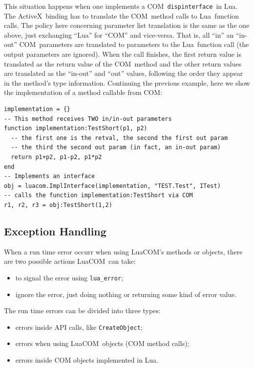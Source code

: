 \documentclass[11pt,a4paper,english]{report}
\newcommand{\ident}[1]{\mbox{\texttt{#1}}}
\newcommand{\techname}[1]{\mbox{#1}}
\newcommand{\lua}{\techname{Lua}}
\newcommand{\com}{\techname{COM}}
\newcommand{\activex}{\techname{ActiveX}}
\newcommand{\luacom}{\techname{LuaCOM}}
\newcommand{\dispinterface}{\ident{dispinterface}}
\begin{document}
  This situation happens when one implements a \com\ \dispinterface\
  in \lua. The \activex\ binding has to translate the \com\ method
  calls to \lua\ function calls. The policy here concerning parameter
  list translation is the same as the one above, just exchanging
  ``Lua'' for ``COM'' and vice-versa. That is, all ``in'' an
  ``in-out'' \com\ parameters are translated to parameters to the
  \lua\ function call (the output parameters are ignored). When the
  call finishes, the first return value is translated as the return
  value of the \com\ method and the other return values are translated
  as the ``in-out'' and ``out'' values, following the order they
  appear in the method's type information. Continuing the previous
  example, here we show the implementation of a method callable from
  \com:

\begin{verbatim}
implementation = {}
-- This method receives TWO in/in-out parameters
function implementation:TestShort(p1, p2)
  -- the first one is the retval, the second the first out param
  -- the third the second out param (in fact, an in-out param)
  return p1+p2, p1-p2, p1*p2
end
-- Implements an interface
obj = luacom.ImplInterface(implementation, "TEST.Test", ITest)
-- calls the function implementation:TestShort via COM
r1, r2, r3 = obj:TestShort(1,2)
\end{verbatim}



\subsection{Exception Handling}
When a run time error occurr when using \luacom's methods or objects,
there are two possible actions \luacom\ can take:

\begin{itemize}
\item to signal the error using \verb+lua_error+;
\item ignore the error, just doing nothing or returning some kind of
error value.
\end{itemize}

The run time errors can be divided into three types:

\begin{itemize}
\item errors inside API calls, like \ident{CreateObject};
\item errors when using \luacom\ objects (COM method calls);
\item errors inside COM objects implemented in Lua.
\end{itemize}
\end{document}
